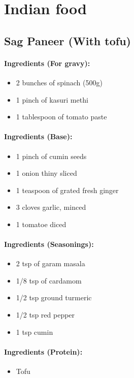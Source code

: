 \documentclass{article}
\begin{document}
\section{Indian food}

\subsection{Sag Paneer (With tofu)}

\paragraph{Ingredients (For gravy):}
\begin{itemize}
\item 2 bunches of spinach (500g)
\item 1 pinch of kasuri methi
\item 1 tablespoon of tomato paste
\end{itemize}

\paragraph{Ingredients (Base):}
\begin{itemize}
\item 1 pinch of cumin seeds
\item 1 onion thiny sliced
\item 1 teaspoon of grated fresh ginger
\item 3 cloves garlic, minced
\item 1 tomatoe diced
\end{itemize}

\paragraph{Ingredients (Seasonings):}
\begin{itemize}
\item 2 tsp of garam masala
\item 1/8 tsp of cardamom
\item 1/2 tsp ground turmeric
\item 1/2 tsp red pepper
\item 1 tsp cumin
\end{itemize}

\paragraph{Ingredients (Protein):}
\begin{itemize}
\item Tofu
\end{itemize}
\end{document}
